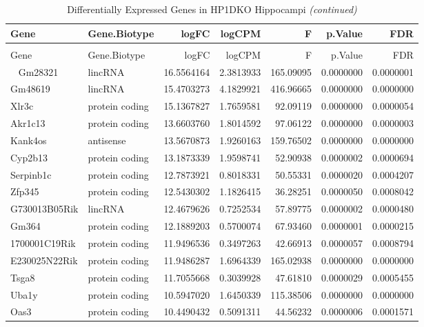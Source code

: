 \documentclass[onehalf,12pt]{beavtex}
\begin{document}
  \begin{longtable}{llrrrrr}
  \caption{\label{tab:DEtable}Differentially Expressed Genes in HP1DKO Hippocampi}\\
  \toprule
  Gene & Gene.Biotype & logFC & logCPM & F & p.Value & FDR\\
  \midrule
  \endfirsthead
  \caption[]{\label{tab:DEtable}Differentially Expressed Genes in HP1DKO Hippocampi \textit{(continued)}}\\
  \toprule
  Gene & Gene.Biotype & logFC & logCPM & F & p.Value & FDR\\
  \midrule
  \endhead
  \
  \endfoot
  \bottomrule
  \endlastfoot
  Gm28321 & lincRNA & 16.5564164 & 2.3813933 & 165.09095 & 0.0000000 & 0.0000001\\
  Gm48619 & lincRNA & 15.4703273 & 4.1829921 & 416.96665 & 0.0000000 & 0.0000000\\
  Xlr3c & protein coding & 15.1367827 & 1.7659581 & 92.09119 & 0.0000000 & 0.0000054\\
  Akr1c13 & protein coding & 13.6603760 & 1.8014592 & 97.06122 & 0.0000000 & 0.0000003\\
  Kank4os & antisense & 13.5670873 & 1.9260163 & 159.76502 & 0.0000000 & 0.0000000\\
  \addlinespace
  Cyp2b13 & protein coding & 13.1873339 & 1.9598741 & 52.90938 & 0.0000002 & 0.0000694\\
  Serpinb1c & protein coding & 12.7873921 & 0.8018331 & 50.55331 & 0.0000020 & 0.0004207\\
  Zfp345 & protein coding & 12.5430302 & 1.1826415 & 36.28251 & 0.0000050 & 0.0008042\\
  G730013B05Rik & lincRNA & 12.4679626 & 0.7252534 & 57.89775 & 0.0000002 & 0.0000480\\
  Gm364 & protein coding & 12.1889203 & 0.5700074 & 67.93460 & 0.0000001 & 0.0000215\\
  \addlinespace
  1700001C19Rik & protein coding & 11.9496536 & 0.3497263 & 42.66913 & 0.0000057 & 0.0008794\\
  E230025N22Rik & protein coding & 11.9486287 & 1.6964339 & 165.02938 & 0.0000000 & 0.0000000\\
  Tsga8 & protein coding & 11.7055668 & 0.3039928 & 47.61810 & 0.0000029 & 0.0005455\\
  Uba1y & protein coding & 10.5947020 & 1.6450339 & 115.38506 & 0.0000000 & 0.0000000\\
  Oas3 & protein coding & 10.4490432 & 0.5091311 & 44.56232 & 0.0000006 & 0.0001571\\

\end{longtable}
\end{document}
